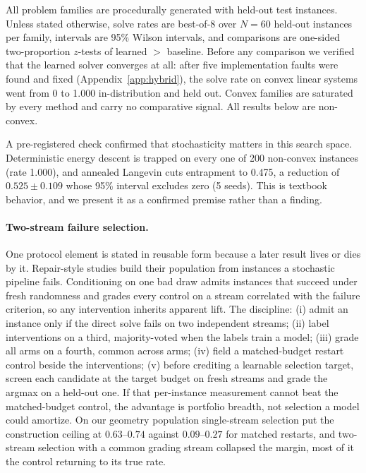 \documentclass[letterpaper]{article} %
\begin{document}
All problem families are procedurally generated with held-out test instances. Unless stated
otherwise, solve rates are best-of-8 over $N = 60$ held-out instances per family, intervals
are 95\% Wilson intervals, and comparisons are one-sided two-proportion $z$-tests of
learned $>$ baseline. Before any comparison we
verified that the learned solver converges at all: after five implementation faults were found
and fixed (Appendix~\ref{app:hybrid}), the solve rate on convex linear systems
went from 0 to 1.000 in-distribution and held out. Convex families are saturated by every
method and carry no comparative signal. All results below are non-convex.

A pre-registered check confirmed that stochasticity matters in
this search space. Deterministic energy descent is trapped on
every one of 200 non-convex instances (rate 1.000), and annealed Langevin cuts entrapment to
0.475, a reduction of $0.525 \pm 0.109$ whose 95\% interval excludes zero (5 seeds). This is
textbook behavior, and we present it as a confirmed premise rather than a finding.

\paragraph{Two-stream failure selection.}
One protocol element is stated in reusable form because a later result lives or dies by it.
Repair-style studies build their population from instances a stochastic pipeline fails.
Conditioning on one bad draw admits instances that succeed under fresh randomness and grades
every control on a stream correlated with the failure criterion, so any intervention inherits
apparent lift. The discipline: (i) admit an
instance only if the direct solve fails on two independent streams; (ii) label interventions
on a third, majority-voted when the labels train a model; (iii) grade all arms on a fourth,
common across arms; (iv) field a matched-budget restart control beside the interventions;
(v) before crediting a learnable selection target, screen each candidate at the target budget
on fresh streams and grade the argmax on a held-out one. If that per-instance measurement
cannot beat the matched-budget control, the advantage is portfolio breadth, not selection a
model could amortize. On our geometry population single-stream selection put the construction ceiling at
$0.63$--$0.74$ against $0.09$--$0.27$ for matched restarts, and two-stream selection with a
common grading stream collapsed the margin, most of it the control returning to its true
rate.
\end{document}
